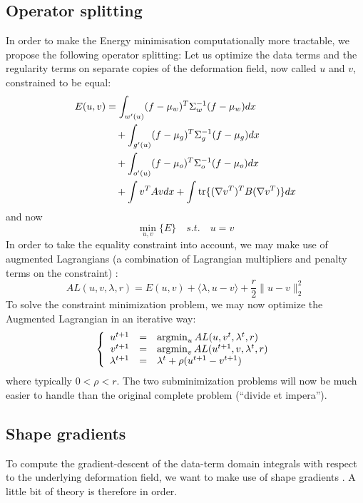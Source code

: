 \subsection{Operator splitting}
In order to make the Energy minimisation computationally more tractable, we propose the following operator splitting: Let us optimize the data terms and the regularity terms on separate copies of the deformation field, now called $u$ and $v$, constrained to be equal:
\begin{align}
E(u,v) &= \int_{w'(u)} (f-\mu_w)^T\Sigma_w^{-1}(f-\mu_w) dx\nonumber\\
&\quad +\int_{g'(u)} (f-\mu_g)^T\Sigma_g^{-1}(f-\mu_g) dx\\
&\quad +\int_{o'(u)} (f-\mu_o)^T\Sigma_o^{-1}(f-\mu_o) dx\nonumber\\
&\quad +\int v^T A v dx + \int \operatorname{tr}\{(\nabla v^T)^T B (\nabla v^T)\} dx\nonumber
\end{align}
and now
\begin{equation}
\min_{u,v} \{ E \} \quad s.t. \quad u = v
\end{equation}
In order to take the equality constraint into account, we may make use of augmented Lagrangians (a combination of Lagrangian multipliers and penalty terms on the constraint)
\cite{bertsekas_multiplier_1976,glowinski_augmented_1989,nocedal_numerical_2006}:
\begin{equation}
AL(u,v,\lambda,r) = E(u,v) + \langle \lambda, u-v \rangle + \frac{r}{2} \| u - v \|_2^2
\end{equation}
To solve the constraint minimization problem, we may now optimize the Augmented Lagrangian in an iterative way:
\begin{equation}
\left\lbrace \begin{array}{rcl}
u^{t+1} &=& \operatorname{argmin}_{u} AL(u,v^t,\lambda^t,r)\\
v^{t+1} &=& \operatorname{argmin}_{v} AL(u^{t+1},v,\lambda^t,r)\\
\lambda^{t+1} &=& \lambda^t + \rho(u^{t+1}-v^{t+1})
\end{array}\right.\end{equation}
where typically $0 < \rho < r$. The two subminimization problems will now be much easier to handle than the original complete problem (``divide et impera'').

\subsection{Shape gradients}
To compute the gradient-descent of the data-term domain integrals with respect to the underlying deformation field, we want to make use of shape gradients \cite{jehan-besson_dream2s:_2003,herbulot_segmentation_2006}. A little bit of theory is therefore in order.


